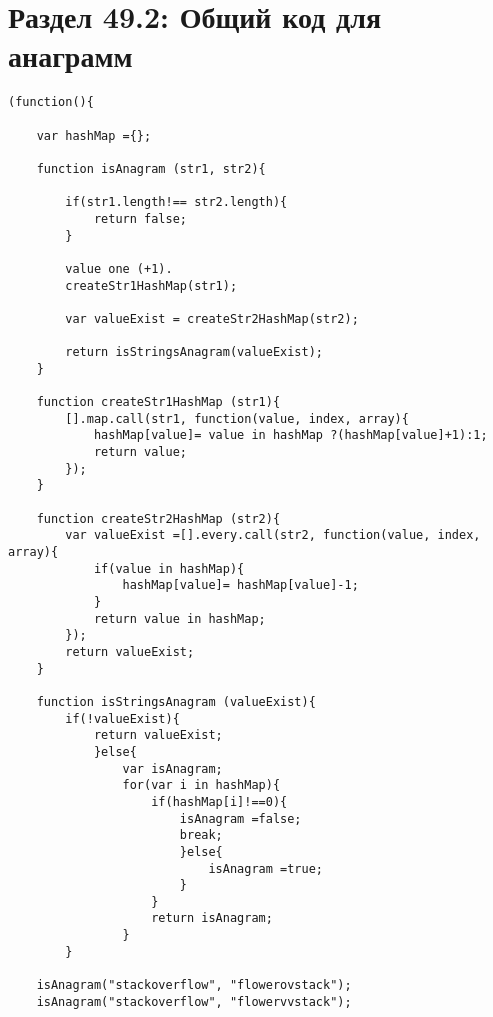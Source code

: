 \section*{Раздел 49.2: Общий код для анаграмм}
\vspace{\baselineskip}
\begin{tcolorbox}
\begin{verbatim}     
(function(){

    var hashMap ={};
    
    function isAnagram (str1, str2){
    
        if(str1.length!== str2.length){
            return false;
        }
        
        value one (+1).
        createStr1HashMap(str1);

        var valueExist = createStr2HashMap(str2);

        return isStringsAnagram(valueExist);
    }
    
    function createStr1HashMap (str1){
        [].map.call(str1, function(value, index, array){
            hashMap[value]= value in hashMap ?(hashMap[value]+1):1;
            return value;
        });
    }
    
    function createStr2HashMap (str2){
        var valueExist =[].every.call(str2, function(value, index, array){
            if(value in hashMap){
                hashMap[value]= hashMap[value]-1;
            }
            return value in hashMap;
        });
        return valueExist;
    }
    
    function isStringsAnagram (valueExist){
        if(!valueExist){
            return valueExist;
            }else{
                var isAnagram;
                for(var i in hashMap){
                    if(hashMap[i]!==0){
                        isAnagram =false;
                        break;
                        }else{
                            isAnagram =true;
                        }
                    }
                    return isAnagram;
                }
        }
        
    isAnagram("stackoverflow", "flowerovstack");
    isAnagram("stackoverflow", "flowervvstack");

\end{verbatim}
\end{tcolorbox}
\vspace{\baselineskip}